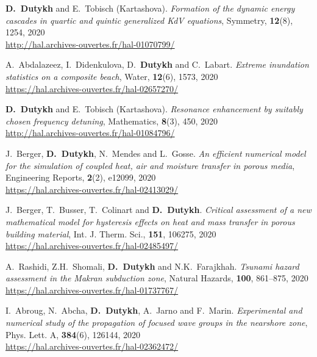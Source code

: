 \begin{etaremune}
  \item \textbf{D.~Dutykh} and E.~Tobisch (Kartashova). \textit{Formation of the dynamic energy cascades in quartic and quintic generalized KdV equations}, Symmetry, \textbf{12}(8), 1254, 2020 \\ %
  \url{http://hal.archives-ouvertes.fr/hal-01070799/}
  
  \item A.~Abdalazeez, I.~Didenkulova, D.~\textbf{Dutykh} and C.~Labart. \textit{Extreme inundation statistics on a composite beach}, Water, \textbf{12}(6), 1573, 2020 \\ %
  \url{https://hal.archives-ouvertes.fr/hal-02657270/}
  
  \item \textbf{D.~Dutykh} and E.~Tobisch (Kartashova). \textit{Resonance enhancement by suitably chosen frequency detuning}, Mathematics, \textbf{8}(3), 450, 2020 \\ %
  \url{http://hal.archives-ouvertes.fr/hal-01084796/}
  
  \item J.~Berger, \textbf{D.~Dutykh}, N.~Mendes and L.~Gosse. \textit{An efficient numerical model for the simulation of coupled heat, air and moisture transfer in porous media}, Engineering Reports, \textbf{2}(2), e12099, 2020 \\ %
  \url{https://hal.archives-ouvertes.fr/hal-02413029/}
  
  \item J.~Berger, T.~Busser, T.~Colinart and \textbf{D.~Dutykh}. \textit{Critical assessment of a new mathematical model for hysteresis effects on heat and mass transfer in porous building material}, Int. J. Therm. Sci., \textbf{151}, 106275, 2020 \\ %
  \url{https://hal.archives-ouvertes.fr/hal-02485497/}
  
  \item A.~Rashidi, Z.H.~Shomali, \textbf{D.~Dutykh} and N.K.~Farajkhah. \textit{Tsunami hazard assessment in the Makran subduction zone}, Natural Hazards, \textbf{100}, 861--875, 2020 \\ %
  \url{https://hal.archives-ouvertes.fr/hal-01737767/}
  
  \item I.~Abroug, N.~Abcha, \textbf{D.~Dutykh}, A.~Jarno and F.~Marin. \textit{Experimental and numerical study of the propagation of focused wave groups in the nearshore zone}, Phys. Lett. A, \textbf{384}(6), 126144, 2020 \\ %
  \url{https://hal.archives-ouvertes.fr/hal-02362472/}
  

\end{etaremune}
